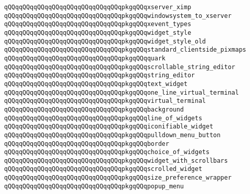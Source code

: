 \verb|qQQqqQQqqQQqqQQqqQQqqQQqqQQqqQQqpkgqQQqxserver_ximp|\newline
\verb|qQQqqQQqqQQqqQQqqQQqqQQqqQQqqQQqpkgqQQqwindowsystem_to_xserver|\newline
\newline
\verb|qQQqqQQqqQQqqQQqqQQqqQQqqQQqqQQqpkgqQQqxevent_types|\newline
\newline
\verb|qQQqqQQqqQQqqQQqqQQqqQQqqQQqqQQqpkgqQQqwidget_style|\newline
\verb|qQQqqQQqqQQqqQQqqQQqqQQqqQQqqQQqpkgqQQqwidget_style_old|\newline
\newline
\verb|qQQqqQQqqQQqqQQqqQQqqQQqqQQqqQQqpkgqQQqstandard_clientside_pixmaps|\newline
\newline
\verb|qQQqqQQqqQQqqQQqqQQqqQQqqQQqqQQqpkgqQQqquark|\newline
\verb|qQQqqQQqqQQqqQQqqQQqqQQqqQQqqQQqpkgqQQqscrollable_string_editor|\newline
\verb|qQQqqQQqqQQqqQQqqQQqqQQqqQQqqQQqpkgqQQqstring_editor|\newline
\verb|qQQqqQQqqQQqqQQqqQQqqQQqqQQqqQQqpkgqQQqtext_widget|\newline
\verb|qQQqqQQqqQQqqQQqqQQqqQQqqQQqqQQqpkgqQQqone_line_virtual_terminal|\newline
\verb|qQQqqQQqqQQqqQQqqQQqqQQqqQQqqQQqpkgqQQqvirtual_terminal|\newline
\verb|qQQqqQQqqQQqqQQqqQQqqQQqqQQqqQQqpkgqQQqbackground|\newline
\verb|qQQqqQQqqQQqqQQqqQQqqQQqqQQqqQQqpkgqQQqline_of_widgets|\newline
\verb|qQQqqQQqqQQqqQQqqQQqqQQqqQQqqQQqpkgqQQqiconifiable_widget|\newline
\verb|qQQqqQQqqQQqqQQqqQQqqQQqqQQqqQQqpkgqQQqpulldown_menu_button|\newline
\verb|qQQqqQQqqQQqqQQqqQQqqQQqqQQqqQQqpkgqQQqborder|\newline
\verb|qQQqqQQqqQQqqQQqqQQqqQQqqQQqqQQqpkgqQQqchoice_of_widgets|\newline
\verb|qQQqqQQqqQQqqQQqqQQqqQQqqQQqqQQqpkgqQQqwidget_with_scrollbars|\newline
\verb|qQQqqQQqqQQqqQQqqQQqqQQqqQQqqQQqpkgqQQqscrolled_widget|\newline
\verb|qQQqqQQqqQQqqQQqqQQqqQQqqQQqqQQqpkgqQQqsize_preference_wrapper|\newline
\verb|qQQqqQQqqQQqqQQqqQQqqQQqqQQqqQQqpkgqQQqpopup_menu|\newline
